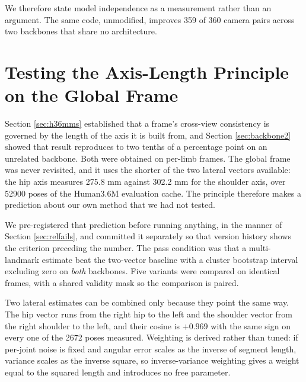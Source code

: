 \documentclass[12pt,a4paper]{report}
\begin{document}
We therefore state model independence as a measurement rather than an argument. The same code, unmodified, improves 359 of 360 camera pairs across two backbones that share no architecture.

\section{Testing the Axis-Length Principle on the Global Frame}
\label{sec:multilandmark}

Section \ref{sec:h36mms} established that a frame's cross-view consistency is governed by the length of the axis it is built from, and Section \ref{sec:backbone2} showed that result reproduces to two tenths of a percentage point on an unrelated backbone. Both were obtained on per-limb frames. The global frame was never revisited, and it uses the shorter of the two lateral vectors available: the hip axis measures 275.8 mm against 302.2 mm for the shoulder axis, over 52900 poses of the Human3.6M evaluation cache. The principle therefore makes a prediction about our own method that we had not tested.

We pre-registered that prediction before running anything, in the manner of Section \ref{sec:relfails}, and committed it separately so that version history shows the criterion preceding the number. The pass condition was that a multi-landmark estimate beat the two-vector baseline with a cluster bootstrap interval excluding zero on \emph{both} backbones. Five variants were compared on identical frames, with a shared validity mask so the comparison is paired.

Two lateral estimates can be combined only because they point the same way. The hip vector runs from the right hip to the left and the shoulder vector from the right shoulder to the left, and their cosine is $+0.969$ with the same sign on every one of the 2672 poses measured. Weighting is derived rather than tuned: if per-joint noise is fixed and angular error scales as the inverse of segment length, variance scales as the inverse square, so inverse-variance weighting gives a weight equal to the squared length and introduces no free parameter.
\end{document}
